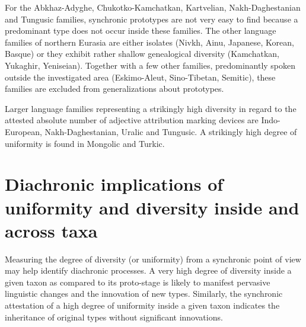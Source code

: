 For the Abkhaz-Adyghe, Chukotko-Kamchatkan, Kartvelian, Nakh\hyp{}Daghestanian and Tungusic families, synchronic prototypes are not very easy to find because a predominant type does not occur inside these families. The other language families of northern Eurasia are either isolates (Nivkh, Ainu, Japanese, Korean, Basque) or they exhibit rather shallow genealogical diversity (Kamchatkan, Yukaghir, Yeniseian). Together with a few other families, predominantly spoken outside the investigated area (Eskimo-Aleut, Sino-Tibetan, Semitic), these families are excluded from generalizations about prototypes. 

Larger language families representing a strikingly high diversity in regard to the attested absolute number of adjective attribution marking devices are Indo-European, Nakh\hyp{}Daghestanian, Uralic and Tungusic. A strikingly high degree of uniformity is found in Mongolic and Turkic.

\section[Diachronic implications]{Diachronic implications of uniformity and diversity inside and across taxa}
Measuring the degree of diversity (or uniformity) from a synchronic point of view may help identify diachronic processes. A very high degree of diversity inside a given taxon as compared to its proto-stage is likely to manifest pervasive linguistic changes and the innovation of new types. Similarly, the synchronic attestation of a high degree of uniformity inside a given taxon indicates the inheritance of original types without significant innovations. 

